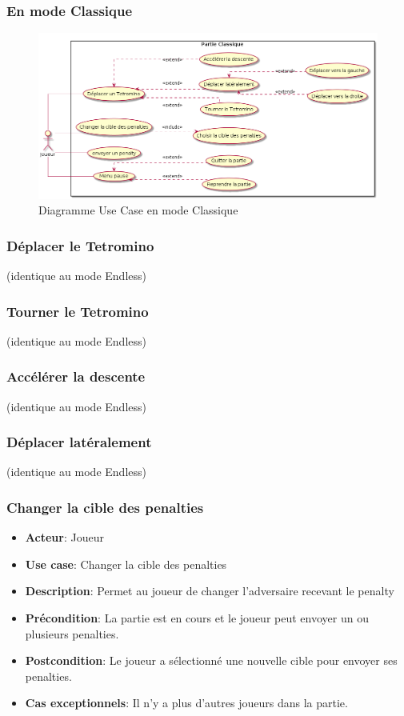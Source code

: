 \documentclass{article}
\begin{document}
\subsubsection{En mode Classique}

\begin{figure}[!h]
    \centering
    \includegraphics[width=1\textwidth]{../res/uml/usecase/ClassicUseCase.png}
    \caption{Diagramme Use Case en mode Classique}
    \label{fig:Endless}
\end{figure}

\subsubsection*{Déplacer le Tetromino} (identique au mode Endless)
\subsubsection*{Tourner le Tetromino} (identique au mode Endless)
\subsubsection*{Accélérer la descente} (identique au mode Endless)
\subsubsection*{Déplacer latéralement} (identique au mode Endless)

\subsubsection*{Changer la cible des penalties}
\begin{itemize}
    \item \textbf{Acteur}: Joueur
    \item \textbf{Use case}: Changer la cible des penalties
    \item \textbf{Description}: Permet au joueur de changer l'adversaire recevant le penalty
    \item \textbf{Précondition}: La partie est en cours et le joueur peut envoyer un ou plusieurs penalties.
    \item \textbf{Postcondition}: Le joueur a sélectionné une nouvelle cible pour envoyer ses penalties.
    \item \textbf{Cas exceptionnels}: Il n'y a plus d'autres joueurs dans la partie.
\end{itemize}
\end{document}

